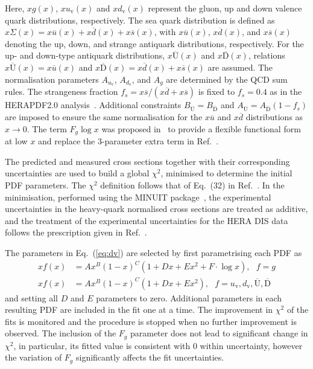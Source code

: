 Here, $xg(x)$, $xu_{\mathrm{v}}(x)$ and $xd_{\mathrm{v}}(x)$ represent the gluon, up and down valence quark distributions, respectively. The sea quark distribution is defined as $x\Sigma(x)=x\overline{u}(x)+x\overline{d}(x)+x\overline{s}(x)$, with $x\overline{u}(x)$, $x\overline{d}(x)$, and $x\overline{s}(x)$ denoting the up, down, and strange antiquark distributions, respectively.
For the up- and down-type antiquark distributions, $x\overline{\mathrm{U}}(x)$ and $x\overline{\mathrm{D}}(x)$, relations $x\overline{\mathrm{U}}(x) = x\overline{u}(x)$ and $x\overline{\mathrm{D}}(x) = x\overline{d}(x) + x\overline{s}(x)$  are assumed.
The normalisation parameters $A_{u_{\mathrm{v}}}$, $A_{d_\mathrm{v}}$, and $A_{g}$ are determined by the QCD sum rules.
The strangeness fraction $f_{s} = x\overline{s}/( x\overline{d} + x\overline{s})$ is fixed to
$f_{s}=0.4$ as in the HERAPDF2.0 analysis~\cite{Abramowicz:2015mha}.
Additional constraints $B_{\overline{\mathrm{U}}} = B_{\overline{\mathrm{D}}}$ and $A_{\overline{\mathrm{U}}} = A_{\overline{\mathrm{D}}}(1 - f_{s})$ are imposed to ensure the same normalisation for the $x\overline{u}$ and $x\overline{d}$ distributions as $x \to 0$.
The term $F_g\log x$ was proposed in~\cite{Bonvini:2019wxf} to provide a flexible functional form at low $x$ and replace the 3-parameter extra term in Ref.~\cite{Abramowicz:2015mha}.

The predicted and measured cross sections together with their corresponding uncertainties are used to build a global $\chi^2$, minimised to determine the initial PDF
parameters. The $\chi^2$ definition follows that of Eq.~(32) in Ref.~\cite{Abramowicz:2015mha}. In the minimisation, performed 
using the MINUIT package~\cite{James:1975dr}, the experimental uncertainties in the heavy-quark normalised cross 
sections are treated as additive, and the treatment of the experimental uncertainties for the HERA DIS data follows 
the prescription given in Ref.~\cite{Abramowicz:2015mha}.

The parameters in Eq.~(\ref{eq:dv}) are selected by first parametrising each PDF as
\begin{equation}
\begin{split}
xf(x) &= Ax^B(1-x)^C(1+Dx+Ex^2+F \cdot {\log x}), ~~~f=g\\
xf(x) &= Ax^B(1-x)^C(1+Dx+Ex^2), 
~~~f=u_\mathrm{v},d_\mathrm{v},\overline{\mathrm{U}},\overline{\mathrm{D}}
\end{split}
\label{eq:de}
\end{equation}
and setting all $D$ and $E$ parameters to zero.
Additional parameters in each resulting PDF are included in the fit one at a time. 
The improvement in $\chi^2$ of the fits is monitored and the procedure is stopped when no further improvement is observed. The inclusion of the $F_{g}$ parameter does not lead to significant change in $\chi^2$, in particular, its fitted value is consistent with $0$ within uncertainty, however the variation of $F_{g}$ significantly affects the fit uncertainties.

